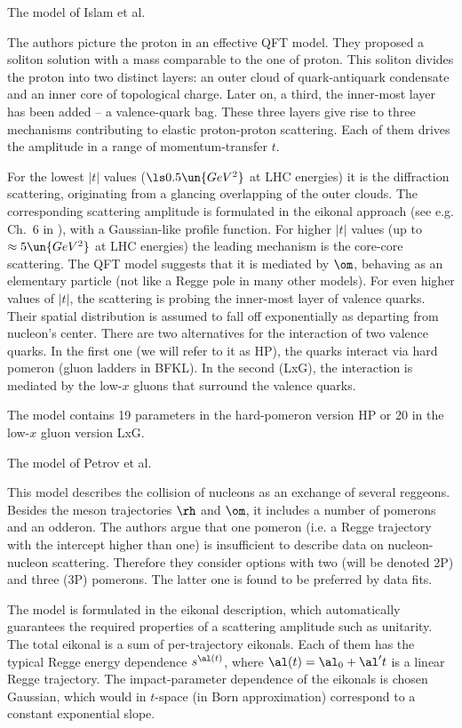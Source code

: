 \caption{The model of Islam et al. }

The authors picture the proton in an effective QFT model. They proposed a soliton solution with a mass comparable to the one of proton. This soliton divides the proton into two distinct layers: an outer cloud of quark-antiquark condensate and an inner core of topological charge. Later on, a third, the inner-most layer has been added -- a valence-quark bag. These three layers give rise to three mechanisms contributing to elastic proton-proton scattering. Each of them drives the amplitude in a range of momentum-transfer $t$.

For the lowest $|t|$ values ($\ls 0.5\un{GeV^2}$ at LHC energies) it is the diffraction scattering, originating from a glancing overlapping of the outer clouds. The corresponding scattering amplitude is formulated in the eikonal approach (see e.g. Ch.~6 in ), with a Gaussian-like profile function. For higher $|t|$ values (up to $\approx 5\un{GeV^2}$ at LHC energies) the leading mechanism is the core-core scattering. The QFT model suggests that it is mediated by $\rm\om$, behaving as an elementary particle (not like a Regge pole in many other models). For even higher values of $|t|$, the scattering is probing the inner-most layer of valence quarks. Their spatial distribution is assumed to fall off exponentially as departing from nucleon's center. There are two alternatives for the interaction of two valence quarks. In the first one (we will refer to it as HP), the quarks interact via hard pomeron (gluon ladders in BFKL). In the second (LxG), the interaction is mediated by the low-$x$ gluons that surround the valence quarks.

The model contains 19 parameters in the hard-pomeron version HP or 20 in the low-$x$ gluon version LxG.

\caption{The model of Petrov et al. }

This model describes the collision of nucleons as an exchange of several reggeons. Besides the meson trajectories $\rm\rh$ and $\rm\om$, it includes a number of pomerons and an odderon. The authors argue that one pomeron (i.e. a Regge trajectory with the intercept higher than one) is insufficient to describe data on nucleon-nucleon scattering. Therefore they consider options with two (will be denoted 2P) and three (3P) pomerons. The latter one is found to be preferred by data fits.

The model is formulated in the eikonal description, which automatically guarantees the required properties of a scattering amplitude such as unitarity. The total eikonal is a sum of per-trajectory eikonals. Each of them has the typical Regge energy dependence $s^{\al(t)}$, where $\al(t) = \al_0 + \al' t$ is a linear Regge trajectory. The impact-parameter dependence of the eikonals is chosen Gaussian, which would in $t$-space (in Born approximation) correspond to a constant exponential slope.

